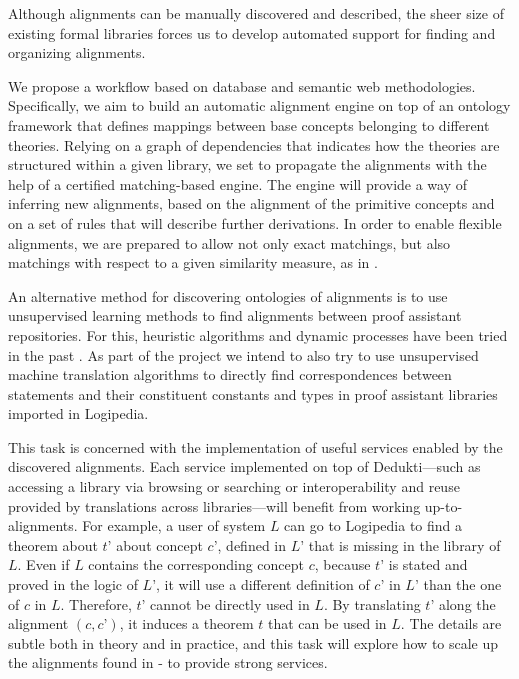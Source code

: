 Although alignments can be manually discovered and described, the
sheer size of existing formal libraries forces us to develop automated
support for finding and organizing alignments.


We propose a workflow based on database and semantic web
methodologies. Specifically, we aim to build an automatic alignment
engine on top of an ontology framework that defines mappings between
base concepts belonging to different theories. Relying on a graph of
dependencies that indicates how the theories are structured within a
given library, we set to propagate the alignments with the help of a
certified matching-based engine. The engine will provide a way of
inferring new alignments, based on the alignment of the primitive
concepts and on a set of rules that will describe further
derivations. In order to enable flexible alignments, we are prepared to allow
not only exact matchings, but also matchings with respect to a given
similarity measure, as in \cite{???}.

An alternative method for discovering ontologies of alignments is
to use unsupervised learning methods to find alignments between proof
assistant repositories. For this, heuristic algorithms and dynamic
processes have been tried in the past \cite{???}.  As part of the
project we intend to also try to use unsupervised machine translation
algorithms \cite{???} to directly find correspondences between
statements and their constituent constants and types in proof
assistant libraries imported in Logipedia.

This task is concerned with the implementation of useful services
enabled by the discovered alignments. Each service implemented on top
of Dedukti---such as accessing a library via browsing or searching
or interoperability and reuse provided by translations across
libraries---will benefit from working up-to-alignments. For example, a
user of system $L$ can go to Logipedia to find a theorem about $t’$
about concept $c’$, defined in $L’$ that is missing in the library of
$L$. Even if $L$ contains the corresponding concept $c$, because $t’$
is stated and proved in the logic of $L’$, it will use a
different definition of $c’$ in $L’$ than the one of $c$ in $L$.
Therefore, $t’$ cannot be directly used in $L$. By translating $t’$
along the alignment $(c,c’)$, it induces a theorem $t$ that can be
used in $L$. The details are subtle both in theory and in practice,
and this task will explore how to scale up the alignments found in
- to
provide strong services.

